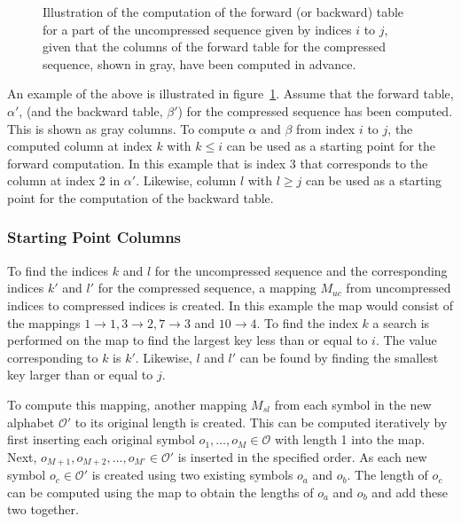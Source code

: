 \begin{figure}
  \centering
  
  \caption{Illustration of the computation of the forward (or backward) table
    for a part of the uncompressed sequence given by indices $i$ to $j$,
    given that the columns of the forward table for the compressed sequence,
    shown in gray, have been computed in advance.}
  \label{fig:subsequence-posterior}
\end{figure}

An example of the above is illustrated in
figure~\ref{fig:subsequence-posterior}. Assume that the forward table, $\alpha'$,
(and the backward table, $\beta'$) for the compressed sequence has been computed.
This is shown as gray columns. To compute $\alpha$ and $\beta$ from index $i$
to $j$, the computed column at index $k$ with $k \le i$ can be used as a
starting point for the forward computation. In this example that is index 3
that corresponds to the column at index 2 in $\alpha'$. Likewise, column
$l$ with $l \ge j$ can be used as a starting point for the
computation of the backward table.

\subsubsection{Starting Point Columns}

To find the indices $k$ and $l$ for the uncompressed sequence and the
corresponding indices $k'$ and $l'$ for the compressed sequence, a
mapping $M_{uc}$ from uncompressed indices to
compressed indices is created. In this example the map would consist of the
mappings $1 \rightarrow 1, 3 \rightarrow 2, 7 \rightarrow 3$ and
$10 \rightarrow 4$. To find the index $k$ a search is performed on the
map to find the largest key less than or equal to $i$. The value corresponding
to $k$ is $k'$. Likewise, $l$ and $l'$ can be found by finding the smallest key
larger than or equal to $j$.

To compute this mapping, another mapping $M_{sl}$ from each
symbol in the new alphabet $\mathcal{O'}$ to its original length is
created. This can be computed iteratively by first inserting each
original symbol $o_1, \dots, o_M \in \mathcal{O}$ with length 1 into the
map. Next, $o_{M+1}, o_{M+2}, \dots, o_{M'} \in \mathcal{O'}$ is inserted in
the specified order. As each new symbol $o_c \in \mathcal{O'}$ is created using
two existing symbols $o_a$ and $o_b$. The length of $o_c$ can be computed
using the map to obtain the lengths of $o_a$ and $o_b$ and add these two
together.

